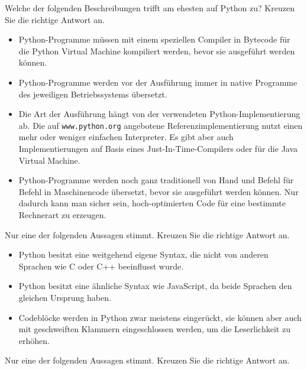 \bigskip
\teilaufgabe
Welche der folgenden Beschreibungen trifft am ehesten auf Python zu? Kreuzen
Sie die richtige Antwort an.

\begin{itemize}
    \renewcommand{\labelitemi}{$\square$}
    \item Python-Programme müssen mit einem speziellen Compiler in Bytecode
    für die Python Virtual Machine kompiliert werden, bevor sie ausgeführt
    werden können.

    \item Python-Programme werden vor der Ausführung immer in native Programme
    des jeweiligen Betriebssystems übersetzt.

    \item Die Art der Ausführung hängt von der verwendeten Python-Implementierung
    ab. Die auf \texttt{www.python.org} angebotene Referenzimplementierung nutzt
    einen mehr oder weniger einfachen Interpreter. Es gibt aber auch Implementierungen
    auf Basis eines Just-In-Time-Compilers oder für die Java Virtual Machine.

    \item Python-Programme werden noch ganz traditionell von Hand und Befehl für
    Befehl in Maschinencode übersetzt, bevor sie ausgeführt werden können. Nur
    dadurch kann man sicher sein, hoch-optimierten Code für eine bestimmte
    Rechnerart zu erzeugen.
\end{itemize}

\teilaufgabe
Nur eine der folgenden Aussagen stimmt. Kreuzen Sie die richtige Antwort an.

\begin{itemize}
    \renewcommand{\labelitemi}{$\square$}
    \item Python besitzt eine weitgehend eigene Syntax, die nicht von anderen
    Sprachen wie C oder C++ beeinflusst wurde.

    \item Python besitzt eine ähnliche Syntax wie JavaScript, da beide Sprachen
    den gleichen Ursprung haben.

    \item Codeblöcke werden in Python zwar meistens eingerückt, sie können aber
    auch mit geschweiften Klammern eingeschlossen werden, um die Leserlichkeit
    zu erhöhen.
\end{itemize}

\teilaufgabe
Nur eine der folgenden Aussagen stimmt. Kreuzen Sie die richtige Antwort an.

